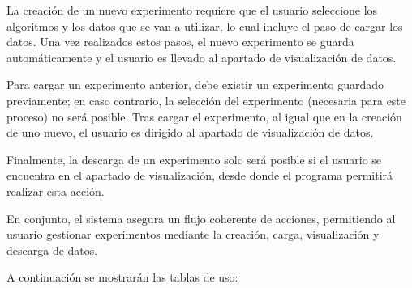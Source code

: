 La creación de un nuevo experimento requiere que el usuario seleccione los algoritmos y los datos que se van a utilizar, lo cual incluye el paso de cargar los datos. Una vez realizados estos pasos, el nuevo experimento se guarda automáticamente y el usuario es llevado al apartado de visualización de datos.

Para cargar un experimento anterior, debe existir un experimento guardado previamente; en caso contrario, la selección del experimento (necesaria para este proceso) no será posible. Tras cargar el experimento, al igual que en la creación de uno nuevo, el usuario es dirigido al apartado de visualización de datos.

Finalmente, la descarga de un experimento solo será posible si el usuario se encuentra en el apartado de visualización, desde donde el programa permitirá realizar esta acción.

En conjunto, el sistema asegura un flujo coherente de acciones, permitiendo al usuario gestionar experimentos mediante la creación, carga, visualización y descarga de datos.

A continuación se mostrarán las tablas de uso:

